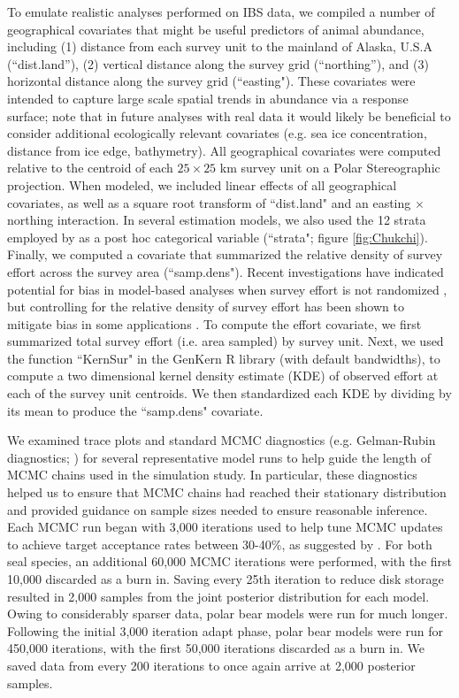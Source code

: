 \documentclass[]{rsos}%
\begin{document}
To emulate realistic analyses performed on IBS data, we compiled a number of geographical covariates that might be useful predictors of animal abundance, including (1) distance from each survey unit to the mainland of Alaska, U.S.A (``dist.land''), (2) vertical distance along the survey grid (``northing''), and (3) horizontal distance along the survey grid (``easting"). These covariates were intended to capture large scale spatial trends in abundance via a response surface; note that in future analyses with real data it would likely be beneficial to consider additional ecologically relevant covariates (e.g. sea ice concentration, distance from ice edge, bathymetry).  All geographical covariates were computed relative to the centroid of each $25\times25$ km survey unit on a Polar Stereographic projection. When modeled, we included linear effects of all geographical covariates, as well as a square root transform of ``dist.land" and an easting $\times$ northing interaction.  In several estimation models, we also used the 12 strata employed by \cite{Bengtson2005} as a post hoc categorical variable (``strata"; figure \ref{fig:Chukchi}). Finally, we computed a covariate that summarized the relative density of survey effort across the survey area (``samp.dens").  Recent investigations have indicated potential for bias in model-based analyses when survey effort is not randomized \cite{DiggleEtAl2010}, but controlling for the relative density of survey effort has been shown to mitigate bias in some applications \cite{PatiEtAl2011}.  To compute the effort covariate, we first summarized total survey effort (i.e. area sampled) by survey unit.  Next, we used the function ``KernSur" in the GenKern R library (with default bandwidths), to compute a two dimensional kernel density estimate (KDE) of observed effort at each of the survey unit centroids.  We then standardized each KDE by dividing by its mean to produce the ``samp.dens" covariate.

We examined trace plots and standard MCMC diagnostics (e.g. Gelman-Rubin diagnostics; \cite{Gelman2004}) for several representative model runs to help guide the length of MCMC chains used in the simulation study.  In particular, these diagnostics helped us to ensure that MCMC chains had reached their stationary distribution and provided guidance on sample sizes needed to ensure reasonable inference.  Each MCMC run began with 3,000 iterations used to help tune MCMC updates to achieve target acceptance rates between 30-40\%, as suggested by \cite{Gelman2004}.  For both seal species, an additional 60,000 MCMC iterations were performed, with the first 10,000 discarded as a burn in.  Saving every 25th iteration to reduce disk storage resulted in 2,000 samples from the joint posterior distribution for each model.  Owing to considerably sparser data, polar bear models were run for much longer.  Following the initial 3,000 iteration adapt phase, polar bear models were run for 450,000 iterations, with the first 50,000 iterations discarded as a burn in.  We saved data from every 200 iterations to once again arrive at 2,000 posterior samples.
\end{document}
